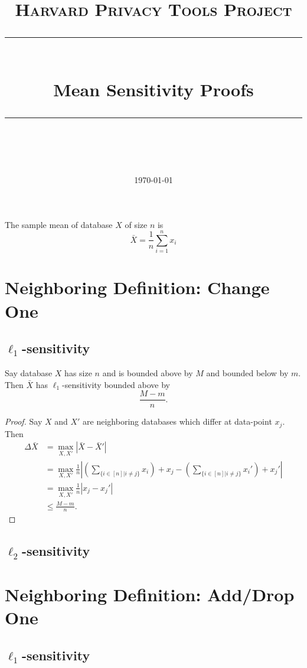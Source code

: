 \documentclass[11pt]{scrartcl} %
\title{
	\normalfont\normalsize
	\textsc{Harvard Privacy Tools Project}\\ %
	\vspace{25pt} %
	\rule{\linewidth}{0.5pt}\\ %
	\vspace{20pt} %
	{\huge Mean Sensitivity Proofs}\\ %
	\vspace{12pt} %
	\rule{\linewidth}{2pt}\\ %
	\vspace{12pt} %
}
\date{\normalsize\today} %
\begin{document}
\maketitle 

\begin{definition}
The sample mean of database $X$ of size $n$ is 
$$\bar{X} = \frac{1}{n} \sum_{i=1}^n x_i $$
\end{definition}

\section{Neighboring Definition: Change One}
\subsection{$\ell_1$-sensitivity}
\begin{theorem}
Say database $X$ has size $n$ and is bounded above by $M$ and bounded below by $m$. Then $\bar{X}$ has $\ell_1$-sensitivity bounded above by 
$$ \frac{M-m}{n}.$$
\end{theorem}

\begin{proof}
Say $X$ and $X'$ are neighboring databases which differ at data-point $x_j$. Then
\begin{align*}
\Delta{\bar{X}} &= \max_{X,X'} \left\vert \bar{X} - \bar{X}' \right\vert \\
	&=  \max_{X,X'} \frac{1}{n} \left\vert \left(\sum_{\{ i \in [n] \vert i \ne j\}} x_i\right) + x_j  - \left(\sum_{\{ i \in [n] \vert i \ne j\}} x_i'\right) + x_j'  \right\vert \\
	&= \max_{X,X'} \frac{1}{n} \left\vert x_j - x_j' \right\vert \\
	&\le \frac{M-m}{n}.
\end{align*}
\end{proof}
\subsection{$\ell_2$-sensitivity}

\section{Neighboring Definition: Add/Drop One}
\subsection{$\ell_1$-sensitivity}
\end{document}
